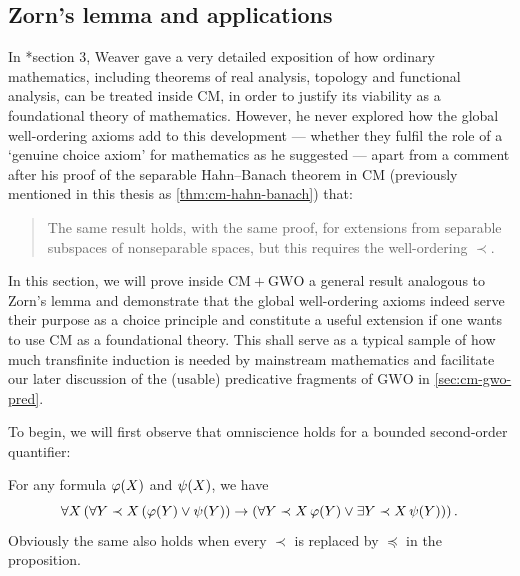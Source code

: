 \documentclass[12pt,openany]{book}
\theoremstyle{plain}
\theoremstyle{definition}
\newcommand\opA[1]{\mathop{\forall #1}}
\newcommand\opE[1]{\mathop{\exists #1}}
\newcommand\CM{\mathrm{CM}}
\newcommand\GWO{\mathrm{GWO}}
\begin{document}
\subsection*{Zorn's lemma and applications}

In \cite{weaver09-cm}*{section 3}, Weaver gave a very detailed exposition of how ordinary mathematics, including theorems of real analysis, topology and functional analysis, can be treated inside $\CM$, in order to justify its viability as a foundational theory of mathematics. However, he never explored how the global well-ordering axioms add to this development --- whether they fulfil the role of a `genuine choice axiom' for mathematics as he suggested --- apart from a comment after his proof of the separable Hahn--Banach theorem in $\CM$ (previously mentioned in this thesis as \autoref{thm:cm-hahn-banach}) that:
\begin{quote}
  The same result holds, with the same proof, for extensions from separable subspaces of nonseparable spaces, but this requires the well-ordering $\prec$.
\end{quote}

In this section, we will prove inside $\CM + \GWO$ a general result analogous to Zorn's lemma and demonstrate that the global well-ordering axioms indeed serve their purpose as a choice principle and constitute a useful extension if one wants to use $\mathrm{CM}$ as a foundational theory. This shall serve as a typical sample of how much transfinite induction is needed by mainstream mathematics and facilitate our later discussion of the (usable) predicative fragments of $\GWO$ in \autoref{sec:cm-gwo-pred}.

To begin, we will first observe that omniscience holds for a bounded second-order quantifier:

\begin{lemma}[$\CM + \GWO$]
  \label{lem:cm-gwo-prec-bounded-so-omni}
  For any formula $\varphi\mleft(X\mright)$ and $\psi\mleft(X\mright)$, we have
  \[\opA{X} \left(\opA{Y \prec X} \left(\varphi\mleft(Y\mright) \lor \psi\mleft(Y\mright)\right) \rightarrow \left(\opA{Y \prec X} \varphi\mleft(Y\mright) \lor \opE{Y \prec X} \psi\mleft(Y\mright)\right)\right).\]
  Obviously the same also holds when every $\prec$ is replaced by $\preceq$ in the proposition.
\end{lemma}
\end{document}
